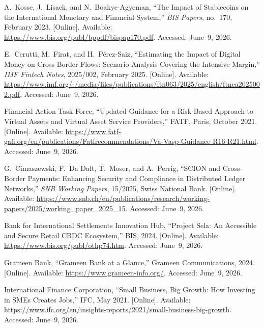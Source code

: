 \documentclass[12pt, a4paper]{report}
\begin{document}
{\begin{enumerate}[label={[\arabic*]}]
\item A.~Kosse, J.~Lisack, and N.~Boakye-Agyeman, ``The Impact of Stablecoins on the International Monetary and Financial System,'' \textit{BIS Papers}, no.~170, February 2023. [Online]. Available: \url{https://www.bis.org/publ/bppdf/bispap170.pdf}. Accessed: June~9, 2026.

\item E.~Cerutti, M.~Firat, and H.~P\'{e}rez-Saiz, ``Estimating the Impact of Digital Money on Cross-Border Flows: Scenario Analysis Covering the Intensive Margin,'' \textit{IMF Fintech Notes}, 2025/002, February 2025. [Online]. Available: \url{https://www.imf.org/-/media/files/publications/ftn063/2025/english/ftnea2025002.pdf}. Accessed: June~9, 2026.

\item Financial Action Task Force, ``Updated Guidance for a Risk-Based Approach to Virtual Assets and Virtual Asset Service Providers,'' FATF, Paris, October 2021. [Online]. Available: \url{https://www.fatf-gafi.org/en/publications/Fatfrecommendations/Va-Vasp-Guidance-R16-R21.html}. Accessed: June~9, 2026.

\item G.~Cimaszewski, F.~Da Dalt, T.~Moser, and A.~Perrig, ``SCION and Cross-Border Payments: Enhancing Security and Compliance in Distributed Ledger Networks,'' \textit{SNB Working Papers}, 15/2025, Swiss National Bank. [Online]. Available: \url{https://www.snb.ch/en/publications/research/working-papers/2025/working_paper_2025_15}. Accessed: June~9, 2026.

\item Bank for International Settlements Innovation Hub, ``Project Sela: An Accessible and Secure Retail CBDC Ecosystem,'' BIS, 2024. [Online]. Available: \url{https://www.bis.org/publ/othp74.htm}. Accessed: June~9, 2026.

\item Grameen Bank, ``Grameen Bank at a Glance,'' Grameen Communications, 2024. [Online]. Available: \url{https://www.grameen-info.org/}. Accessed: June~9, 2026.

\item International Finance Corporation, ``Small Business, Big Growth: How Investing in SMEs Creates Jobs,'' IFC, May 2021. [Online]. Available: \url{https://www.ifc.org/en/insights-reports/2021/small-business-big-growth}. Accessed: June~9, 2026.
\end{enumerate}
}
\end{document}
